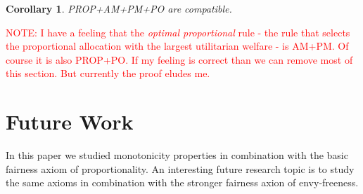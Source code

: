 \documentclass[a4paper,12pt]{article}
\newtheorem{cor}{Corollary}[section]
\begin{document}
\begin{cor}
PROP+AM+PM+PO are compatible.
\end{cor}

\textcolor{red}{NOTE: I have a feeling that the \emph{optimal proportional} rule - the rule that selects the proportional allocation with the largest utilitarian welfare - is AM+PM. Of course it is also PROP+PO. If my feeling is correct than we can remove most of this section. But currently the proof eludes me.}








\section{Future Work}
In this paper we studied monotonicity properties in combination with the basic fairness axiom of proportionality. An interesting future research topic is to study the same axioms in combination with the stronger fairness axion of envy-freeness.



\fi


\end{document}
